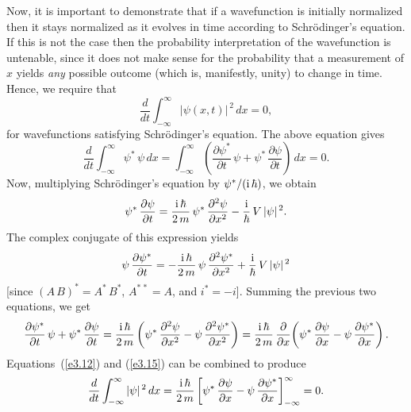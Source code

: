Now, it is  important to demonstrate that if a wavefunction is initially
normalized then it stays normalized as it evolves in time according
to Schr\"{o}din\-ger's equation. If this is not the case then
the probability interpretation of the wavefunction is untenable, since it
does not make sense for the probability that a measurement  of $x$ yields {\em any}\/ possible outcome (which is, manifestly, unity) to change in time.
Hence, we require that
\begin{equation}
\frac{d}{dt}\int_{-\infty}^{\infty}|\psi(x,t)|^{\,2} \,dx = 0,
\end{equation}
for  wavefunctions satisfying Schr\"{o}dinger's equation.
The above equation gives
\begin{equation}\label{e3.12}
\frac{d}{dt}\int_{-\infty}^{\infty}\psi^{\ast}\,\psi\,dx=
\int_{-\infty}^{\infty}\left(\frac{\partial\psi^{\ast}}{\partial t}\,\psi
+\psi^\ast\,\frac{\partial\psi}{\partial t}\right)\,dx=0.
\end{equation}
Now, multiplying Schr\"{o}dinger's equation by $\psi^{\ast}/({\rm i}\,\hbar)$,
we obtain
\begin{equation}
\psi^{\ast}\,\frac{\partial\psi}{\partial t}= \frac{{\rm i}\,\hbar}{2\,m}\,\psi^\ast\,\frac{\partial^2\psi}{\partial x^2} - \frac{{\rm i}}{\hbar}\,V\,|\psi|^{\,2}.
\end{equation}
The complex conjugate of this expression yields
\begin{equation}
\psi\,\frac{\partial\psi^\ast}{\partial t}= -\frac{{\rm i}\,\hbar}{2\,m}\,\psi\,\frac{\partial^2\psi^\ast}{\partial x^2} + \frac{{\rm i}}{\hbar}\,V\,|\psi|^{\,2}
\end{equation}
[since $(A\,B)^\ast = A^\ast\,B^\ast$, $A^{\ast\,\ast}=A$, and $i^\ast= -i$].
Summing the previous two equations, we get
\begin{equation}\label{e3.15}
\frac{\partial\psi^\ast}{\partial t} \,\psi+ \psi^{\ast}\,\frac{\partial\psi}{\partial t} = \frac{{\rm i}\,\hbar}{2\,m}\left(
\psi^\ast\,\frac{\partial^2\psi}{\partial x^2}-\psi\,\frac{\partial^2\psi^\ast}{\partial x^2}\right)=\frac{{\rm i}\,\hbar}{2\,m}\,\frac{\partial}{\partial x}\!\left(\psi^\ast\,\frac{\partial\psi}{\partial x} - \psi\,\frac{\partial\psi^\ast}{\partial x}\right).
\end{equation}
Equations~(\ref{e3.12}) and (\ref{e3.15}) can be combined to
produce
\begin{equation}
\frac{d}{dt}\int_{-\infty}^{\infty}|\psi|^{\,2}\,dx=
\frac{{\rm i}\,\hbar}{2\,m}\left[\psi^\ast\,\frac{\partial\psi}{\partial x} - \psi\,\frac{\partial\psi^\ast}{\partial x}\right]_{-\infty}^{\infty} = 0.
\end{equation}
